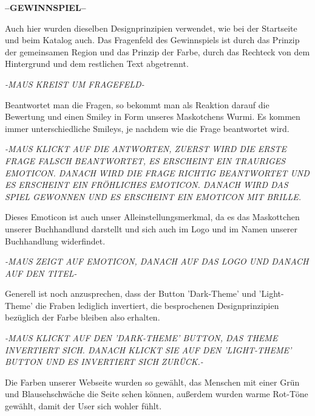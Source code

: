 \documentclass{article}
\begin{document}
\begin{center}
\textbf{--GEWINNSPIEL--}
\end{center}
Auch hier wurden dieselben Designprinzipien verwendet, wie bei der Startseite und beim Katalog auch. Das Fragenfeld des Gewinnspiels ist durch das Prinzip der gemeinsamen Region und das Prinzip der Farbe, durch das Rechteck von dem Hintergrund und dem restlichen Text abgetrennt. 
\begin{center}
\textit{-MAUS KREIST UM FRAGEFELD-}
\end{center}
Beantwortet man die Fragen, so bekommt man als Reaktion darauf die Bewertung und einen Smiley in Form unseres Maskotchens Wurmi. Es kommen immer unterschiedliche Smileys, je nachdem wie die Frage beantwortet wird.
\begin{center}
\textit{-MAUS KLICKT AUF DIE ANTWORTEN, ZUERST WIRD DIE ERSTE FRAGE FALSCH BEANTWORTET, ES ERSCHEINT EIN TRAURIGES EMOTICON. DANACH WIRD DIE FRAGE RICHTIG BEANTWORTET UND ES ERSCHEINT EIN FRÖHLICHES EMOTICON. DANACH WIRD DAS SPIEL GEWONNEN UND ES ERSCHEINT EIN EMOTICON MIT BRILLE.}
\end{center}
Dieses Emoticon ist auch unser Alleinstellungsmerkmal, da es das Maskottchen unserer Buchhandlund darstellt und sich auch im Logo und im Namen unserer Buchhandlung widerfindet. 
\begin{center}
\textit{-MAUS ZEIGT AUF EMOTICON, DANACH AUF DAS LOGO UND DANACH AUF DEN TITEL-}
\end{center}
Generell ist noch anzusprechen, dass der Button 'Dark-Theme' und 'Light-Theme' die Fraben lediglich invertiert, die besprochenen Designprinzipien bezüglich der Farbe bleiben also erhalten.
\begin{center}
\textit{-MAUS KLICKT AUF DEN 'DARK-THEME' BUTTON, DAS THEME INVERTIERT SICH. DANACH KLICKT SIE AUF DEN 'LIGHT-THEME' BUTTON UND ES INVERTIERT SICH ZURÜCK.-}
\end{center}
Die Farben unserer Webseite wurden so gewählt, das Menschen mit einer Grün und Blausehschwäche die Seite sehen können, außerdem wurden warme Rot-Töne gewählt, damit der User sich wohler fühlt.
\end{document}
